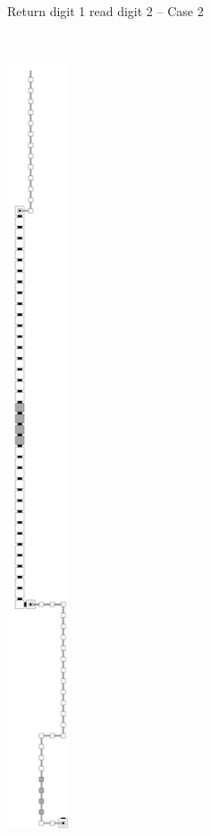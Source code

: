 \begin{figure}[H]
\begin{subfigure}[t]{0.2\textwidth}
                \caption{\label{fig:return_paths/return_digit1_read_digit2_case2_msr} Return digit 1 read digit 2 -- Case 2}
            \end{subfigure}%
            ~
            \begin{subfigure}[t]{0.2\textwidth}
                \centering
                \includegraphics[width=0.2\textwidth]{return_paths/return_digit2_read_digit3_general}

\end{subfigure}
\end{figure}
